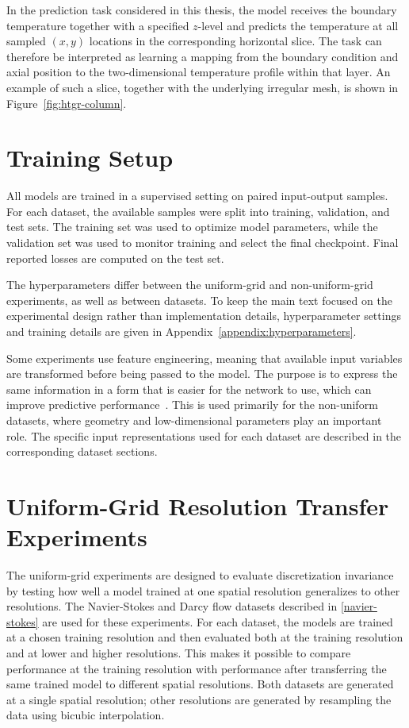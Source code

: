 In the prediction task considered in this thesis, the model receives the
boundary temperature together with a specified $z$-level and predicts
the temperature at all sampled $(x,y)$ locations in the corresponding
horizontal slice. The task can therefore be interpreted as learning a
mapping from the boundary condition and axial position to the
two-dimensional temperature profile within that layer. An example of
such a slice, together with the underlying irregular mesh, is shown in
Figure~\ref{fig:htgr-column}.


\section{Training Setup}

All models are trained in a supervised setting on paired input-output
samples. For each dataset, the available samples were split into training, validation, and test sets. The training set was used to optimize model parameters, while the validation set was used to monitor training and select the final checkpoint. Final reported losses are computed on the test set.

The hyperparameters differ between the uniform-grid and
non-uniform-grid experiments, as well as between datasets. To keep the main text focused on the experimental
design rather than implementation details, hyperparameter settings and training details are given in Appendix~\ref{appendix:hyperparameters}.

Some experiments use feature engineering, meaning that available input variables are transformed before being passed to the model. The purpose is to express the same information in a form that is easier for the network to use, which can improve predictive performance~\cite{feature-engineering}. This is used primarily for the non-uniform datasets, where geometry and low-dimensional parameters play an important role. The specific input representations used for each dataset are described in the corresponding dataset sections.


\section{Uniform-Grid Resolution Transfer Experiments}\label{uniform-experiments}

The uniform-grid experiments are designed to evaluate discretization
invariance by testing how well a model trained at one spatial resolution
generalizes to other resolutions. The Navier-Stokes and Darcy flow
datasets described in \ref{navier-stokes} are used for these experiments. For each dataset, the models are trained at a chosen training resolution and then
evaluated both at the training resolution and at lower and higher
resolutions. This makes it possible to compare performance at the
training resolution with performance after transferring the same trained
model to different spatial resolutions. Both datasets are generated at a single spatial resolution; other resolutions are generated by resampling the data using bicubic interpolation.

